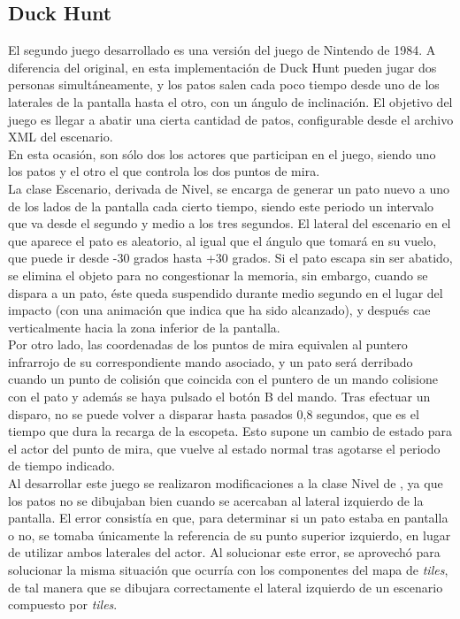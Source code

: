 \subsection{Duck Hunt}

El segundo juego desarrollado es una versión del juego de Nintendo de 1984. A diferencia del original, en esta implementación de Duck Hunt pueden jugar dos personas simultáneamente, y los patos salen cada poco tiempo desde uno de los laterales de la pantalla hasta el otro, con un ángulo de inclinación. El objetivo del juego es llegar a abatir una cierta cantidad de patos, configurable desde el archivo XML del escenario.\\

En esta ocasión, son sólo dos los actores que participan en el juego, siendo uno los patos y el otro el que controla los dos puntos de mira.\\

La clase Escenario, derivada de Nivel, se encarga de generar un pato nuevo a uno de los lados de la pantalla cada cierto tiempo, siendo este periodo un intervalo que va desde el segundo y medio a los tres segundos. El lateral del escenario en el que aparece el pato es aleatorio, al igual que el ángulo que tomará en su vuelo, que puede ir desde -30 grados hasta +30 grados. Si el pato escapa sin ser abatido, se elimina el objeto para no congestionar la memoria, sin embargo, cuando se dispara a un pato, éste queda suspendido durante medio segundo en el lugar del impacto (con una animación que indica que ha sido alcanzado), y después cae verticalmente hacia la zona inferior de la pantalla.\\

Por otro lado, las coordenadas de los puntos de mira equivalen al puntero infrarrojo de su correspondiente mando asociado, y un pato será derribado cuando un punto de colisión que coincida con el puntero de un mando colisione con el pato y además se haya pulsado el botón B del mando. Tras efectuar un disparo, no se puede volver a disparar hasta pasados 0,8 segundos, que es el tiempo que dura la recarga de la escopeta. Esto supone un cambio de estado para el actor del punto de mira, que vuelve al estado normal tras agotarse el periodo de tiempo indicado.\\

Al desarrollar este juego se realizaron modificaciones a la clase Nivel de , ya que los patos no se dibujaban bien cuando se acercaban al lateral izquierdo de la pantalla. El error consistía en que, para determinar si un pato estaba en pantalla o no, se tomaba únicamente la referencia de su punto superior izquierdo, en lugar de utilizar ambos laterales del actor. Al solucionar este error, se aprovechó para solucionar la misma situación que ocurría con los componentes del mapa de \emph{tiles}, de tal manera que se dibujara correctamente el lateral izquierdo de un escenario compuesto por \emph{tiles}.\\


